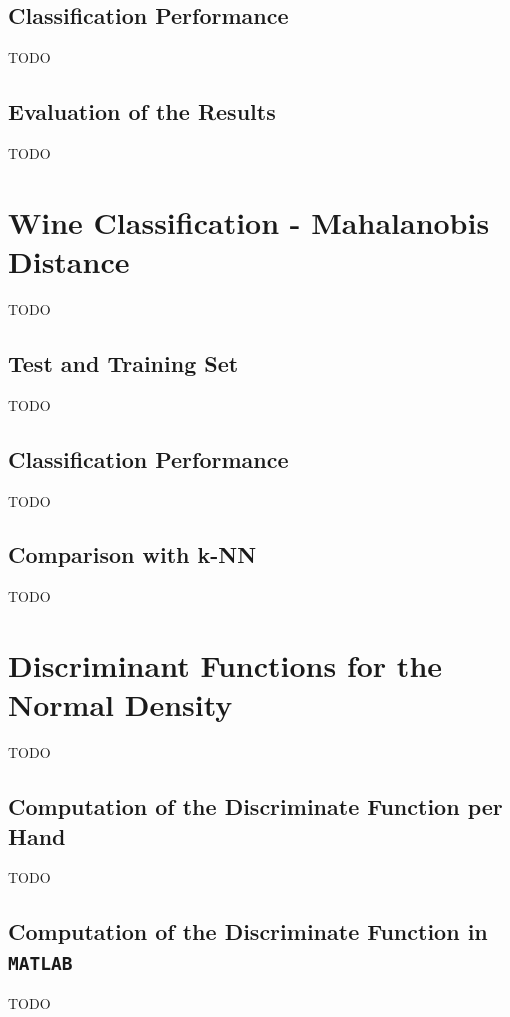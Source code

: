 \documentclass[a4paper,psfig,subfigure,epsfig,fleqn,amssmb,float,caption,fontenc,ausarbeitung]{article}
\begin{document}
\subsection{Classification Performance}
\label{sec:kNNperformance}

TODO


\subsection{Evaluation of the Results}
\label{sec:kNNResults}

TODO


\section{Wine Classification - Mahalanobis Distance}
\label{sec:Mahalanobis}

TODO


\subsection{Test and Training Set}
\label{sec:MahalanobisTestSet}

TODO


\subsection{Classification Performance}
\label{sec:MahalanobisPerformance}

TODO


\subsection{Comparison with k-NN}
\label{sec:MahalanobisComparison}

TODO


\section{Discriminant Functions for the Normal Density}
\label{sec:DiscriminantFunctions}

TODO


\subsection{Computation of the Discriminate Function per Hand}
\label{sec:Hand}

TODO


\subsection{Computation of the Discriminate Function in \texttt{MATLAB}}
\label{sec:Matlab}

TODO


\pagebreak


\fontsize{9}{10pt}


\end{document}
